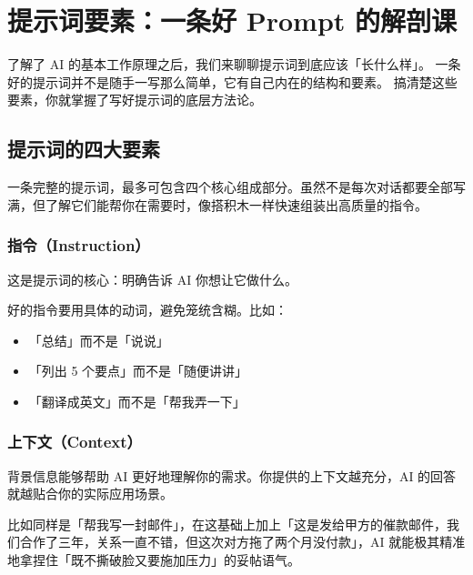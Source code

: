 % 
% 


\chapter{提示词要素：一条好 Prompt 的解剖课}
\label{ch:prompt-elements}

了解了 AI 的基本工作原理之后，我们来聊聊提示词到底应该「长什么样」。
一条好的提示词并不是随手一写那么简单，它有自己内在的结构和要素。
搞清楚这些要素，你就掌握了写好提示词的底层方法论。

\section{提示词的四大要素}

一条完整的提示词，最多可包含四个核心组成部分。虽然不是每次对话都要全部写满，但了解它们能帮你在需要时，像搭积木一样快速组装出高质量的指令。

\subsection*{指令（Instruction）}

这是提示词的核心：明确告诉 AI 你想让它做什么。

好的指令要用具体的动词，避免笼统含糊。比如：

\begin{itemize}
  \item 「总结」而不是「说说」
  \item 「列出 5 个要点」而不是「随便讲讲」
  \item 「翻译成英文」而不是「帮我弄一下」
\end{itemize}

\subsection*{上下文（Context）}

背景信息能够帮助 AI 更好地理解你的需求。你提供的上下文越充分，AI 的回答就越贴合你的实际应用场景。

比如同样是「帮我写一封邮件」，在这基础上加上「这是发给甲方的催款邮件，我们合作了三年，关系一直不错，但这次对方拖了两个月没付款」，AI 就能极其精准地拿捏住「既不撕破脸又要施加压力」的妥帖语气。


